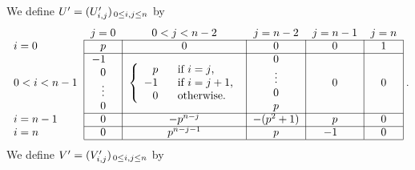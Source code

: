 \documentclass[a4paper,11pt]{amsart}
\begin{document}
\quad We define $U'=(U'_{i,j})_{\hspace{1.3pt}0\leq i,j\leq n}$ by 
\begin{equation}\begin{tabular}{ l|c|c|c|c|c| }
\multicolumn{1}{r}{}
 & \multicolumn{1}{c}{$j=0$}
 &  \multicolumn{1}{c}{$0<j<n-2$}
 & \multicolumn{1}{c}{$j=n-2$} 
 & \multicolumn{1}{c}{$j=n-1$}
 & \multicolumn{1}{c}{$j=n$}
\\
\cline{2-6}
$i=0$&$p$ &0&0&0&1\\
\cline{2-6}
$0<i<n-1$ & $\begin{matrix}-1\hspace{8pt}\\0\\ \vdots\\0\end{matrix}$& $\left\{\begin{array}{cl}
p&\text{if  $i=j$,}\\
-1\hspace{8pt}&\text{if  $i=j+1$,}\\
0&\text{otherwise.}    
      \end{array}\right.$&$\begin{matrix}0\\ \vdots\\0\\p\end{matrix}$&0&0\\
\cline{2-6}
$i=n-1$ & 0 & $-p^{n-j}$&$-(p^2+1)$&$p$&0\\
\cline{2-6}
$i=n$ &0 &$p^{n-j-1}$&$p$&$-1\hspace{8pt}$&0\\
\cline{2-6}
\end{tabular}\hspace{2.5pt}. %
\nonumber \end{equation}
\begin{equation}\label{u'}\end{equation}
\quad We define $V'=(V'_{i,j})_{\hspace{1.3pt}0\leq i,j\leq n}$
by 
\end{document}
